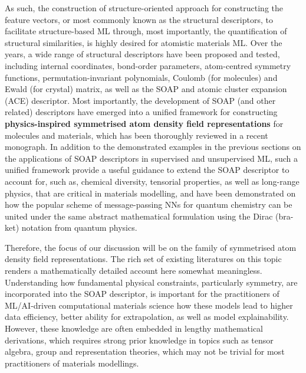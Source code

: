 As such, the construction of structure-oriented approach for constructing the feature vectors, or most commonly known as the structural descriptors, to facilitate structure-based ML through, most importantly, the quantification of structural similarities, is highly desired for atomistic materials ML. Over the years, a wide range of structural descriptors have been proposed and tested, including internal coordinates\cite{pulay1979systematic,echenique2006definition},  bond-order parameters,\cite{steinhardt1983bond}  atom-centred symmetry functions,\cite{behler2011atom} permutation-invariant polynomials,\cite{braams2009permutationally} Coulomb (for molecules)\cite{rupp2012fast} and Ewald (for crystal) matrix,\cite{faber2015crystal} as well as the SOAP\cite{bartok2013representing} and atomic cluster expansion (ACE) descriptor.\cite{drautz2019atomic} Most importantly, the development of SOAP (and other related\cite{drautz2019atomic,behler2011atom,shapeev2016moment}) descriptors have emerged into a unified framework\cite{willatt2019atom} for constructing \textbf{physics-inspired symmetrised atom density field representations} for molecules and materials, which has been thoroughly reviewed in a recent monograph.\cite{musil2021physics} In addition to the demonstrated examples in the previous sections on the applications of SOAP descriptors in supervised and unsupervised ML, such a unified framework provide a useful guidance to extend the SOAP descriptor to account for, such as, chemical diversity,\cite{de2016comparing,willatt2018feature}  tensorial properties,\cite{grisafi2018symmetry} as well as long-range physics,\cite{grisafi2019incorporating} that are critical in materials modelling, and have been demonstrated\cite{nigam2022unified} on how the popular scheme of  message-passing NNs for quantum chemistry\cite{gilmer2017neural} can be united under the same abstract mathematical formulation using the Dirac (bra-ket) notation from quantum physics. 

 

Therefore, the focus of our discussion will be on the family of symmetrised atom density field representations. The rich set of existing literatures on this topic renders a mathematically detailed account here somewhat meaningless. Understanding how fundamental physical constraints, particularly symmetry, are incorporated into the SOAP descriptor, is important for the practitioners of ML/AI-driven computational materials science how these models lead to higher data efficiency, better ability for extrapolation, as well as model explainability. However, these knowledge are often embedded in lengthy mathematical derivations, which requires strong prior knowledge in topics such as tensor algebra, group and representation theories, which may not be trivial for most practitioners of materials modellings. 

